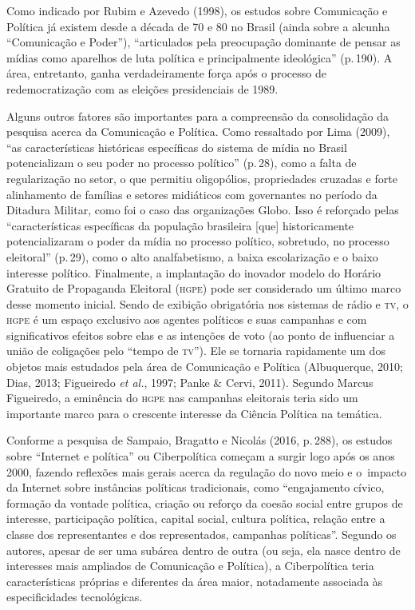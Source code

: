 Como indicado por Rubim e Azevedo (1998), os estudos sobre Comunicação e
Política já existem desde a década de 70 e 80 no Brasil (ainda sobre a
alcunha ``Comunicação e Poder''), ``articulados pela preocupação
dominante de pensar as mídias como aparelhos de luta política e
principalmente ideológica'' (p.\,190). A área, entretanto, ganha
verdadeiramente força após o processo de redemocratização com as
eleições presidenciais de 1989.

Alguns outros fatores são importantes para a compreensão da consolidação
da pesquisa acerca da Comunicação e Política. Como ressaltado por Lima
(2009), ``as características históricas específicas do sistema de mídia
no Brasil potencializam o seu poder no processo político'' (p.\,28), como
a falta de regularização no setor, o que permitiu oligopólios,
propriedades cruzadas e forte alinhamento de famílias e setores
midiáticos com governantes no período da Ditadura Militar, como foi o
caso das organizações Globo. Isso é reforçado pelas ``características
específicas da população brasileira {[}que{]} historicamente
potencializaram o poder da mídia no processo político, sobretudo, no
processo eleitoral'' (p.\,29), como o alto analfabetismo, a baixa
escolarização e o baixo interesse político. Finalmente, a implantação do
inovador modelo do Horário Gratuito de Propaganda Eleitoral (\textsc{hgpe}) pode
ser considerado um último marco desse momento inicial. Sendo de exibição
obrigatória nos sistemas de rádio e \textsc{tv}, o \textsc{hgpe} é um espaço exclusivo aos
agentes políticos e suas campanhas e com significativos efeitos sobre
elas e as intenções de voto (ao ponto de influenciar a união de
coligações pelo ``tempo de \textsc{tv}''). Ele se tornaria rapidamente um dos
objetos mais estudados pela área de Comunicação e Política (Albuquerque,
2010; Dias, 2013; Figueiredo \emph{et al.}, 1997; Panke \& Cervi, 2011).
Segundo Marcus Figueiredo, a eminência do \textsc{hgpe} nas campanhas eleitorais
teria sido um importante marco para o crescente interesse da Ciência
Política na temática.

Conforme a pesquisa de Sampaio, Bragatto e Nicolás (2016, p.\,288), os
estudos sobre ``Internet e política'' ou Ciberpolítica começam a surgir
logo após os anos 2000, fazendo reflexões mais gerais acerca da
regulação do novo meio e o~impacto da Internet sobre instâncias
políticas tradicionais, como ``engajamento cívico, formação da vontade
política, criação ou reforço da coesão social entre grupos de interesse,
participação política, capital social, cultura política, relação entre a
classe dos representantes e dos representados, campanhas políticas''.
Segundo os autores, apesar de ser uma subárea dentro de outra (ou seja,
ela nasce dentro de interesses mais ampliados de Comunicação e
Política), a Ciberpolítica teria características próprias e diferentes
da área maior, notadamente associada às especificidades tecnológicas.


